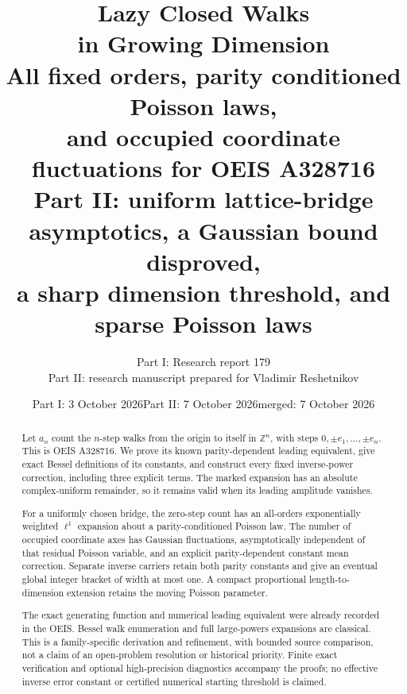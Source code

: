 \documentclass[11pt,letterpaper]{article}
\title{\textbf{Lazy Closed Walks\\in Growing Dimension}\\[7pt]\large All fixed orders, parity conditioned Poisson laws,\\and occupied coordinate fluctuations for OEIS A328716\\[6pt]\normalsize Part II: uniform lattice-bridge asymptotics, a Gaussian bound disproved,\\a sharp dimension threshold, and sparse Poisson laws}
\author{Part I: Research report 179\\[2pt]Part II: research manuscript prepared for Vladimir Reshetnikov}
\date{Part I: 3 October 2026\quad Part II: 7 October 2026\quad merged: 7 October 2026}
\theoremstyle{remark}\newtheorem{remark}[theorem]{Remark}
\begin{document}
\maketitle
\begin{abstract}
Let $a_n$ count the $n$-step walks from the origin to itself in $\mathbb Z^n$, with steps $0,\pm e_1,\ldots,\pm e_n$. This is OEIS A328716. We prove its known parity-dependent leading equivalent, give exact Bessel definitions of its constants, and construct every fixed inverse-power correction, including three explicit terms. The marked expansion has an absolute complex-uniform remainder, so it remains valid when its leading amplitude vanishes.

For a uniformly chosen bridge, the zero-step count has an all-orders exponentially weighted $\ell^1$ expansion about a parity-conditioned Poisson law. The number of occupied coordinate axes has Gaussian fluctuations, asymptotically independent of that residual Poisson variable, and an explicit parity-dependent constant mean correction. Separate inverse carriers retain both parity constants and give an eventual global integer bracket of width at most one. A compact proportional length-to-dimension extension retains the moving Poisson parameter.

The exact generating function and numerical leading equivalent were already recorded in the OEIS. Bessel walk enumeration and full large-powers expansions are classical. This is a family-specific derivation and refinement, with bounded source comparison, not a claim of an open-problem resolution or historical priority. Finite exact verification and optional high-precision diagnostics accompany the proofs; no effective inverse error constant or certified numerical starting threshold is claimed.
\end{abstract}
\end{document}
